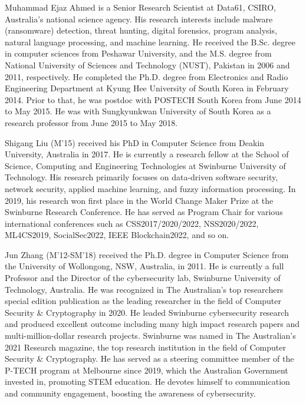 \documentclass[lettersize,journal]{IEEEtran}
\begin{document}
\begin{IEEEbiography}
{Muhammad Ejaz Ahmed} is a Senior Research Scientist at Data61, CSIRO, Australia's national science agency. His research interests include malware (ransomware) detection, threat hunting, digital forensics, program analysis, natural language processing, and machine learning. He received the B.Sc. degree in computer sciences from Peshawar University, and the M.S. degree from National University of Sciences and Technology (NUST), Pakistan in 2006 and 2011, respectively. He completed the Ph.D. degree from Electronics and Radio Engineering Department at Kyung Hee University of South Korea in February 2014. Prior to that, he was postdoc with POSTECH South Korea from June 2014 to May 2015. He was with Sungkyunkwan University of South Korea as a research professor from June 2015 to May 2018.
\end{IEEEbiography}

\begin{IEEEbiography}
{Shigang Liu}
(M'15) received his PhD in Computer Science from Deakin University, Australia in 2017. He is currently a research fellow at the School of Science, Computing and Engineering Technologies at Swinburne University of Technology. His research primarily focuses on data-driven software security, network security, applied machine learning, and fuzzy information processing. In 2019, his research won first place in the World Change Maker Prize at the Swinburne Research Conference. He has served as Program Chair for various international conferences such as CSS2017/2020/2022, NSS2020/2022, ML4CS2019, SocialSec2022, IEEE Blockchain2022, and so on.
\end{IEEEbiography}



\begin{IEEEbiography}
{Jun Zhang}
(M’12-SM’18) received the Ph.D. degree in Computer Science from the University of Wollongong, NSW, Australia, in 2011. He is currently a full Professor and the Director of the cybersecurity lab, Swinburne University of Technology, Australia. He was recognized in The Australian’s top researchers special edition publication as the leading researcher in the field of Computer Security \& Cryptography in 2020. He leaded Swinburne cybersecurity research and produced excellent outcome including many high impact research papers and multi-million-dollar research projects. Swinburne was named in The Australian's 2021 Research magazine, the top research institution in the field of Computer Security \& Cryptography. He has served as a steering committee member of the P-TECH program at Melbourne since 2019, which the Australian Government invested in, promoting STEM education. He devotes himself to communication and community engagement, boosting the awareness of cybersecurity.
\end{IEEEbiography}
\end{document}
